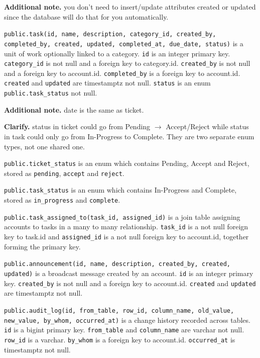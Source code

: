 \documentclass[12pt,letterpaper]{article}
\newenvironment{note}[1][Additional note]
  {\begin{notebox}\noindent\textbf{#1.}\space\ignorespaces}
  {\end{notebox}}
\begin{document}
\begin{note}
you don't need to insert/update attributes created or updated since the
database will do that for you automatically.
\end{note}

\texttt{public.task(id, name, description, category\_id, created\_by,
completed\_by, created, updated, completed\_at, due\_date, status)} is a unit
of work optionally linked to a category. \texttt{id} is an integer primary key.
\texttt{category\_id} is not null and a foreign key to category.id.
\texttt{created\_by} is not null and a foreign key to account.id.
\texttt{completed\_by} is a foreign key to account.id. \texttt{created} and
\texttt{updated} are timestamptz not null. \texttt{status} is an enum
\texttt{public.task\_status} not null.

\begin{note}
date is the same as ticket.
\end{note}

\begin{note}[Clarify]
status in ticket could go from Pending $\to$ Accept/Reject while status in task
could only go from In-Progress to Complete. They are two separate enum types,
not one shared one.
\end{note}

\texttt{public.ticket\_status} is an enum which contains Pending, Accept and
Reject, stored as \texttt{pending}, \texttt{accept} and \texttt{reject}.

\texttt{public.task\_status} is an enum which contains In-Progress and
Complete, stored as \texttt{in\_progress} and \texttt{complete}.

\texttt{public.task\_assigned\_to(task\_id, assigned\_id)} is a join table
assigning accounts to tasks in a many to many relationship. \texttt{task\_id}
is a not null foreign key to task.id and \texttt{assigned\_id} is a not null
foreign key to account.id, together forming the primary key.

\texttt{public.announcement(id, name, description, created\_by, created,
updated)} is a broadcast message created by an account. \texttt{id} is an
integer primary key. \texttt{created\_by} is not null and a foreign key to
account.id. \texttt{created} and \texttt{updated} are timestamptz not null.

\texttt{public.audit\_log(id, from\_table, row\_id, column\_name, old\_value,
new\_value, by\_whom, occurred\_at)} is a change history recorded across
tables. \texttt{id} is a bigint primary key. \texttt{from\_table} and
\texttt{column\_name} are varchar not null. \texttt{row\_id} is a varchar.
\texttt{by\_whom} is a foreign key to account.id. \texttt{occurred\_at} is
timestamptz not null.
\end{document}
